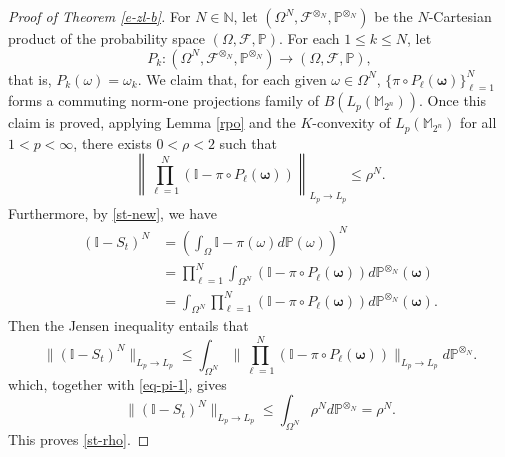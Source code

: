 \documentclass{amsbook}
\theoremstyle{definition}
\theoremstyle{remark}
\numberwithin{section}{chapter}
\numberwithin{equation}{chapter}
\newcommand{\M}{\mathbb{M}}
\newcommand{\1}{\mathbf{1}}
\begin{document}
\begin{proof}[Proof of Theorem \ref{e-zl-b}]
For $N\in\mathbb{N}$, let $(\Omega^N, \mathcal{F}^{\otimes_N},\mathbb{P}^{\otimes_N})$ be the $N$-Cartesian product of the probability space $(\Omega, \mathcal{F},\mathbb{P})$. For each $1\leq k\leq N$, let
$$P_k:(\Omega^N, \mathcal{F}^{\otimes_N},\mathbb{P}^{\otimes_N})\rightarrow(\Omega, \mathcal{F},\mathbb{P}),$$
that is, $P_k(\omega)=\omega_k$.
 We claim that, for each given $\omega\in \Omega^N$, $\{\pi\circ P_{\ell}(\mathbf{\omega})\}_{\ell=1}^N$ forms a commuting norm-one projections family of $B(L_p(\mathbb{M}_{2^n}))$. Once this claim is proved, applying Lemma \ref{rpo} and the $K$-convexity of $L_{p}(\M_{2^{n}})$ for all $1<p<\infty$,  there exists $0<\rho<2$ such that
\begin{equation}\label{eq-pi-1}
\left\|\prod_{\ell=1}^N(\mathbb{I}-\pi\circ P_{\ell}(\mathbf{\omega}))\right\|_{L_{p}\rightarrow L_{p}}\leq \rho^N.
\end{equation}
Furthermore, by \eqref{st-new}, we have
\begin{align*}
(\mathbb{I}-S_t)^N&=\left(\int_\Omega\mathbb{I}-\pi(\omega)d\mathbb{P}(\omega)\right)^N\\
&=\prod_{\ell=1}^N\int_{\Omega^N}(\mathbb{I}-\pi\circ P_{\ell}(\mathbf{\omega}))d\mathbb{P}^{\otimes_N}(\mathbf{\omega})\\
&=\int_{\Omega^N}\prod_{\ell=1}^N(\mathbb{I}-\pi\circ P_{\ell}(\mathbf{\omega}))d\mathbb{P}^{\otimes_N}(\mathbf{\omega}).
\end{align*}
Then the Jensen inequality entails that
$$\|(\mathbb{I}-S_t)^N\|_{L_{p}\rightarrow L_{p}}\leq \int_{\Omega^N}\|\prod_{\ell=1}^N(\mathbb{I}-\pi\circ P_{\ell}(\mathbf{\omega}))\|_{L_{p}\rightarrow L_{p}}d\mathbb{P}^{\otimes_N}.$$
which, together with \eqref{eq-pi-1}, gives
$$\|(\mathbb{I}-S_t)^N\|_{L_{p}\rightarrow L_{p}}\leq \int_{\Omega^N}\rho^Nd\mathbb{P}^{\otimes_N}=\rho^N.$$
This proves \eqref{st-rho}.


\end{proof}
\end{document}
